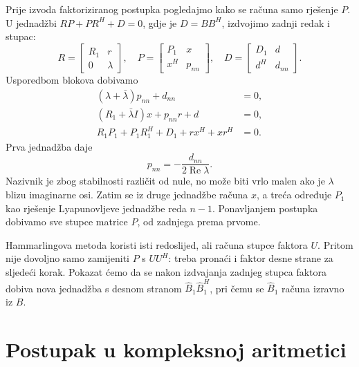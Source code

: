 \documentclass[12pt,a4paper]{article}
\begin{document}
Prije izvoda faktoriziranog postupka pogledajmo kako se računa samo rješenje $P$. U jednadžbi $RP + PR^{H} + D = 0$, gdje je $D = BB^{H}$, izdvojimo zadnji redak i stupac:
\[
R = \begin{bmatrix} R_1 & r \\ 0 & \lambda \end{bmatrix}, \quad
P = \begin{bmatrix} P_1 & x \\ x^{H} & p_{nn} \end{bmatrix}, \quad
D = \begin{bmatrix} D_1 & d \\ d^{H} & d_{nn} \end{bmatrix}.
\]
Usporedbom blokova dobivamo
\begin{align*}
(\lambda + \bar{\lambda})p_{nn} + d_{nn} &= 0, \\
(R_1 + \bar{\lambda}I)x + p_{nn}r + d &= 0, \\
R_1P_1 + P_1R_1^{H} + D_1 + rx^{H} + xr^{H} &= 0.
\end{align*}
Prva jednadžba daje
\[
p_{nn} = -\frac{d_{nn}}{2\operatorname{Re}\lambda}.
\]
Nazivnik je zbog stabilnosti različit od nule, no može biti vrlo malen ako je $\lambda$ blizu imaginarne osi. Zatim se iz druge jednadžbe računa $x$, a treća određuje $P_1$ kao rješenje Lyapunovljeve jednadžbe reda $n-1$. Ponavljanjem postupka dobivamo sve stupce matrice $P$, od zadnjega prema prvome.

Hammarlingova metoda koristi isti redoslijed, ali računa stupce faktora $U$. Pritom nije dovoljno samo zamijeniti $P$ s $UU^{H}$: treba pronaći i faktor desne strane za sljedeći korak. Pokazat ćemo da se nakon izdvajanja zadnjeg stupca faktora dobiva nova jednadžba s desnom stranom $\widehat{B}_1\widehat{B}_1^{H}$, pri čemu se $\widehat{B}_1$ računa izravno iz $B$.

\section{Postupak u kompleksnoj aritmetici}
\end{document}
